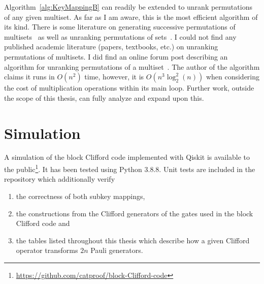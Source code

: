 Algorithm~\ref{alg:KeyMappingB} can readily be extended to unrank permutations of any given multiset. As far as I am aware, this is the most efficient algorithm of its kind. There is some literature on generating successive permutations of multisets~\cite{takaoka2015multi} as well as unranking permutations of sets~\cite{myrvold2001ranking}. I could not find any published academic literature (papers, textbooks, etc.) on unranking permutations of multisets. I did find an online forum post describing an algorithm for unranking permutations of a multiset~\cite{unrankingMultisetStackOverflow}. The author of the algorithm claims it runs in $O\left(n^2\right)$ time, however, it is $O\left(n^3 \log_2^2 (n)\right)$ when considering the cost of multiplication operations within its main loop. Further work, outside the scope of this thesis, can fully analyze and expand upon this.

\section{Simulation}
A simulation of the block Clifford code implemented with Qiskit is available to the public\footnote{\url{https://github.com/catproof/block-Clifford-code}}. It has been tested using Python 3.8.8. Unit tests are included in the repository which additionally verify
\begin{enumerate}
    \item the correctness of both subkey mappings,
    \item the constructions from the Clifford generators of the gates used in the block Clifford code and
    \item the tables listed throughout this thesis which describe how a given Clifford operator transforms $2n$ Pauli generators.
\end{enumerate}

